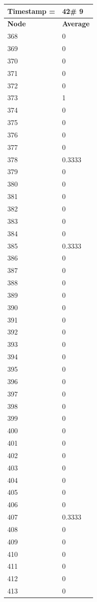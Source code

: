 \begin{tabular}{|l||l|}
\hline
\textbf{Timestamp =} & \textbf{42}\# 9\\\hline
	\textbf{Node} & \textbf{Average} \\ \hline
\hline
	368 & 0 \\ \hline
	369 & 0 \\ \hline
	370 & 0 \\ \hline
	371 & 0 \\ \hline
	372 & 0 \\ \hline
	373 & 1 \\ \hline
	374 & 0 \\ \hline
	375 & 0 \\ \hline
	376 & 0 \\ \hline
	377 & 0 \\ \hline
	378 & 0.3333 \\ \hline
	379 & 0 \\ \hline
	380 & 0 \\ \hline
	381 & 0 \\ \hline
	382 & 0 \\ \hline
	383 & 0 \\ \hline
	384 & 0 \\ \hline
	385 & 0.3333 \\ \hline
	386 & 0 \\ \hline
	387 & 0 \\ \hline
	388 & 0 \\ \hline
	389 & 0 \\ \hline
	390 & 0 \\ \hline
	391 & 0 \\ \hline
	392 & 0 \\ \hline
	393 & 0 \\ \hline
	394 & 0 \\ \hline
	395 & 0 \\ \hline
	396 & 0 \\ \hline
	397 & 0 \\ \hline
	398 & 0 \\ \hline
	399 & 0 \\ \hline
	400 & 0 \\ \hline
	401 & 0 \\ \hline
	402 & 0 \\ \hline
	403 & 0 \\ \hline
	404 & 0 \\ \hline
	405 & 0 \\ \hline
	406 & 0 \\ \hline
	407 & 0.3333 \\ \hline
	408 & 0 \\ \hline
	409 & 0 \\ \hline
	410 & 0 \\ \hline
	411 & 0 \\ \hline
	412 & 0 \\ \hline
	413 & 0 \\ \hline
\end{tabular}

